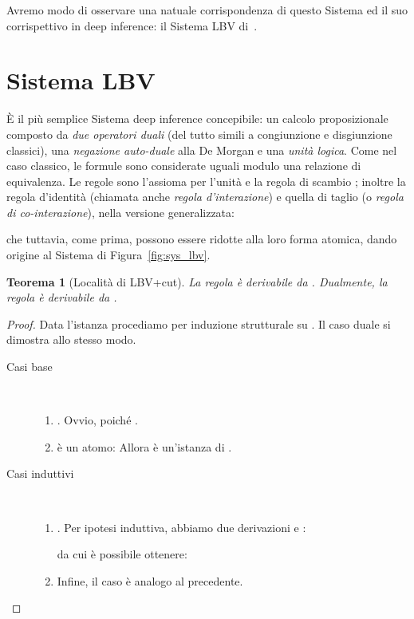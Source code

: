\documentclass[12pt,a4paper,openright,twoside]{report}
\newtheorem{thm}{Teorema}[section]
\begin{document}
Avremo modo di osservare una natuale corrispondenza di questo Sistema ed il suo corrispettivo in deep inference: il Sistema \textsf{LBV} di~\cite{Gug02}.
\newpage

\section{Sistema LBV}

\`E il pi\`u semplice Sistema deep inference concepibile: un calcolo proposizionale composto da \emph{due operatori duali} (del tutto simili a congiunzione e disgiunzione classici), una \emph{negazione auto-duale} alla De Morgan e una \emph{unit\`a logica}. Come nel caso classico, le formule sono considerate uguali modulo una relazione di equivalenza. Le regole sono l'assioma  per l'unit\`a e la regola di scambio ; inoltre la regola d'identit\`a (chiamata anche \emph{regola d'interazione}) e quella di taglio (o \emph{regola di co-interazione}), nella versione generalizzata:

che tuttavia, come prima, possono essere ridotte alla loro forma atomica, dando origine al Sistema di Figura~\ref{fig:sys_lbv}.

\begin{thm}[Localit\`a di \textsf{LBV+cut}]\label{thm:loc_lbv}
La regola  \`e derivabile da . Dualmente, la regola  \`e derivabile da .
\end{thm}
\begin{proof}
Data l'istanza  procediamo per induzione strutturale su . Il caso duale  si dimostra allo stesso modo.
\begin{description}
	\item[Casi base] ~
	\begin{enumerate}
		\item . Ovvio, poich\'e .
		\item  \`e un atomo: Allora  \`e un'istanza di .
	\end{enumerate}
	\item[Casi induttivi] ~
	\begin{enumerate}[resume]
		\item . Per ipotesi induttiva, abbiamo due derivazioni  e :
		
		da cui \`e possibile ottenere:
		
		\item Infine, il caso  \`e analogo al precedente.
	\end{enumerate}
\end{description}
\end{proof}
\end{document}
